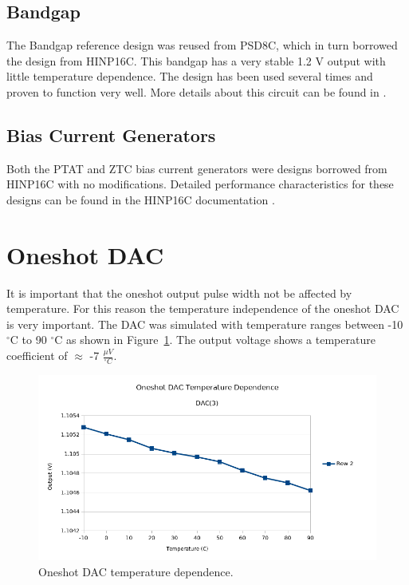\documentclass[12pt,oneside,final]{siuethesis}
\theoremstyle{definition}
\begin{document}
\subsection{Bandgap}
\par The Bandgap reference design was reused from PSD8C, which in turn borrowed the design from HINP16C. This bandgap has a very stable 1.2 V output with little temperature dependence. The design has been used several times and proven to function very well. More details about this circuit can be found in \cite{HINP-THESIS}.

\subsection{Bias Current Generators}
\par Both the PTAT and ZTC bias current generators were designs borrowed from HINP16C with no modifications. Detailed performance characteristics for these designs can be found in the HINP16C documentation \cite{HINP-THESIS}.

\section{Oneshot DAC}
\par It is important that the oneshot output pulse width not be affected by temperature. For this reason the temperature independence of the oneshot DAC is very important. The DAC was simulated with temperature ranges between -10 $^{\circ}$C to 90 $^{\circ}$C as shown in Figure~\ref{fig:dactemp}. The output voltage shows a temperature coefficient of $\approx$ -7 $\frac{\mu V}{^{\circ}C}$.
\begin{figure}[htbp!]
\centering
\includegraphics[scale=.55,keepaspectratio=true]{data/dac_temp.png}
\caption{Oneshot DAC temperature dependence.}
\label{fig:dactemp}
\end{figure}
\end{document}
